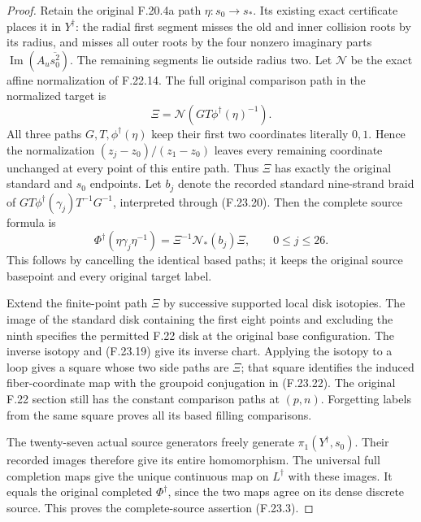 \begin{proof}
Retain the original F.20.4a path $\eta:s_0\to s_*$.
Its existing exact certificate places it in $Y^\dagger$:
the radial first segment misses the old and inner collision
roots by its radius, and misses all outer roots by the four
nonzero imaginary parts $\operatorname{Im}(A_u\overline{s_0^2})$.
The remaining segments lie outside radius two.
Let $\mathcal N$ be the exact affine normalization of F.22.14.
The full original comparison path in the normalized target is
\[
             \Xi=\mathcal N(GT\phi^\dagger(\eta)^{-1}).         \tag{F.23.21}
\]
All three paths $G,T,\phi^\dagger(\eta)$ keep their first
two coordinates literally $0,1$. Hence the normalization
$(z_j-z_0)/(z_1-z_0)$ leaves every remaining coordinate
unchanged at every point of this entire path. Thus $\Xi$
has exactly the original standard and $s_0$ endpoints.
Let $b_j$ denote the recorded standard nine-strand braid
of $GT\phi^\dagger(\gamma_j)T^{-1}G^{-1}$, interpreted through
(F.23.20). Then the complete source formula is
\[
 \Phi^\dagger(\eta\gamma_j\eta^{-1})
           =\Xi^{-1}\mathcal N_*(b_j)\Xi,
                          \qquad0\leq j\leq26.                 \tag{F.23.22}
\]
This follows by cancelling the identical based paths; it keeps
the original source basepoint and every original target label.

Extend the finite-point path $\Xi$ by successive supported local
disk isotopies. The image of the standard disk containing the
first eight points and excluding the ninth specifies the
permitted F.22 disk at the original base configuration. The
inverse isotopy and (F.23.19) give its inverse chart. Applying
the isotopy to a loop gives a square whose two side paths are
$\Xi$; that square identifies the induced fiber-coordinate map
with the groupoid conjugation in (F.23.22). The original F.22
section still has the constant comparison paths at $(p,n)$.
Forgetting labels from the same square proves all its based
filling comparisons.

The twenty-seven actual source generators freely generate
$\pi_1(Y^\dagger,s_0)$. Their recorded images therefore give
its entire homomorphism. The universal full completion maps
give the unique continuous map on $L^\dagger$ with these images.
It equals the original completed $\Phi^\dagger$, since the
two maps agree on its dense discrete source. This proves
the complete-source assertion (F.23.3).


\end{proof}
